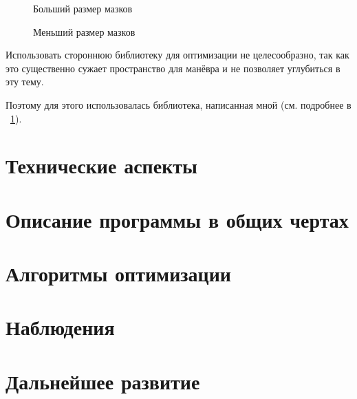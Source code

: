 \documentclass[11pt]{article}
\begin{document}
    \begin{figure}[h!]
        \centering
        \caption{Больший размер мазков}
        \label{fig:my-van-gog-wide}
    \end{figure}
    \FloatBarrier

    \begin{figure}[h!]
        \centering
        \caption{Меньший размер мазков}
        \label{fig:my-van-gog-thin}
    \end{figure}
    \FloatBarrier


    Использовать стороннюю библиотеку для оптимизации не целесообразно,
    так как это существенно сужает пространство для манёвра и не позволяет
    углубиться в эту тему.

    Поэтому для этого использовалась библиотека, написанная мной (см. подробнее в ~\ref{sec:tecnical}).

    \section{Технические аспекты}\label{sec:tecnical}
    


    \section{Описание программы в общих чертах}\label{sec:general_description}
    


    \section {Алгоритмы оптимизации}\label{sec:opimization_algorithms}
    

    \section{Наблюдения}\label{sec:observations}
    

    \section{Дальнейшее развитие}\label{sec:todo}
    
\end{document}
